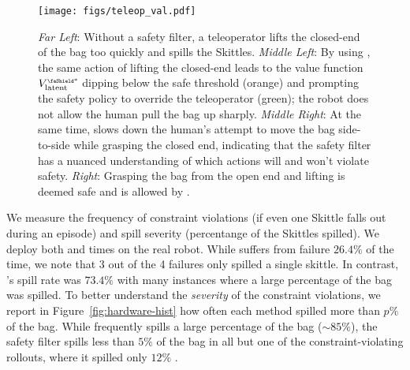 \begin{figure*}[t!]
    \centering
    \texttt{[image: figs/teleop\_val.pdf]}
    \caption{
    \textit{Far Left}: Without a safety filter, a teleoperator lifts the closed-end of the bag too quickly and spills the Skittles. \textit{Middle Left}: By using \ours, the same action of lifting the closed-end leads to the value function $\valfuncLatent^\shield$ dipping below the safe threshold (orange) and prompting the safety policy to override the teleoperator (green); the robot does not allow the human pull the bag up sharply. 
    \textit{Middle Right}: At the same time, \ours slows down the human's attempt to move the bag side-to-side while grasping the closed end, indicating that the safety filter has a nuanced understanding of which actions will and won't violate safety.
    \textit{Right}: Grasping the bag from the open end and lifting is deemed safe and is allowed by \ours.}
    \label{fig:teleop-results}
\end{figure*}

We measure the frequency of constraint violations (if even one Skittle falls out during an episode) and spill severity (percentange of the Skittles spilled). We deploy both \diffpolicy and  times on the real robot. 
While \ours suffers from failure $26.4\%$ of the time, we note that 3 out of the 4 failures only spilled a single skittle. In contrast, \diffpolicy's spill rate was $73.4\%$ with many instances where a large percentage of the bag was spilled.
To better understand the \textit{severity} of the constraint violations, we report in Figure~\ref{fig:hardware-hist} how often each method spilled more than $p\%$ of the bag.
While \diffpolicy frequently spills a large percentage of the bag ($\sim 85\%$), the safety filter spills less than $5\%$ of the bag in all but one of the constraint-violating rollouts, where it spilled only $12\%$
. 





